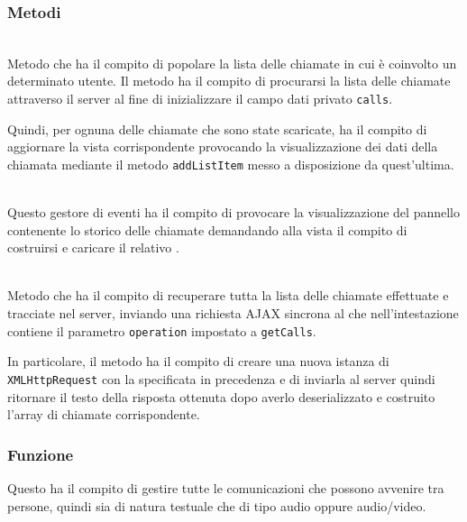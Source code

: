 \subsubsection*{Metodi}
\begin{description}

  \item{}\\
  Metodo che ha il compito di popolare la lista delle chiamate in cui è coinvolto un determinato utente. Il metodo ha il compito di procurarsi la lista delle chiamate attraverso il server al fine di inizializzare il campo dati privato \verb'calls'.
  
  Quindi, per ognuna delle chiamate che sono state scaricate, ha il compito di aggiornare la vista corrispondente provocando la visualizzazione dei dati della chiamata mediante il metodo \verb'addListItem' messo a disposizione da quest'ultima.
  
  \item{}\\
  Questo gestore di eventi ha il compito di provocare la visualizzazione del pannello contenente lo storico delle chiamate demandando alla vista il compito di costruirsi e caricare il relativo .
  
    \item{}\\
  Metodo che ha il compito di recuperare tutta la lista delle chiamate effettuate e tracciate nel server, inviando una richiesta AJAX sincrona al  che nell'intestazione contiene il parametro \verb'operation' impostato a \verb'getCalls'.
  
  In particolare, il metodo ha il compito di creare una nuova istanza di \verb'XMLHttpRequest' con la  specificata in precedenza e di inviarla al server quindi ritornare il testo della risposta ottenuta dopo averlo deserializzato e costruito l'array di chiamate corrispondente.

\end{description}


\subsubsection*{Funzione}
Questo  ha il compito di gestire tutte le comunicazioni che possono avvenire tra persone, quindi sia di natura testuale che di tipo audio oppure audio/video.


